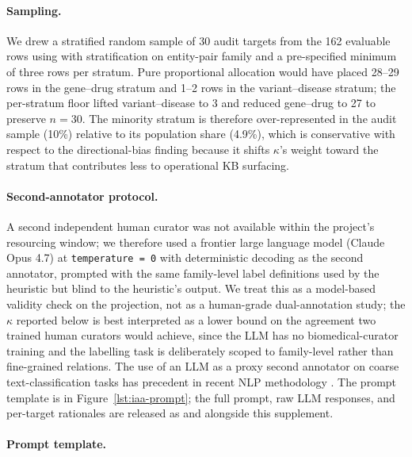 \paragraph{Sampling.}
We drew a stratified random sample of 30 audit targets from the 162
evaluable rows using  with stratification on
entity-pair family and a pre-specified minimum of three rows per
stratum. Pure proportional allocation would have placed 28--29 rows
in the gene--drug stratum and 1--2 rows in the variant--disease
stratum; the per-stratum floor lifted variant--disease to 3 and
reduced gene--drug to 27 to preserve \(n=30\). The minority stratum
is therefore over-represented in the audit sample (10\%) relative
to its population share (4.9\%), which is conservative with respect
to the directional-bias finding because it shifts \(\kappa\)'s
weight toward the stratum that contributes less to operational KB
surfacing.

\paragraph{Second-annotator protocol.}
A second independent human curator was not available within the
project's resourcing window; we therefore used a frontier large
language model (Claude Opus 4.7) at \texttt{temperature = 0} with
deterministic decoding as the second annotator, prompted with the
same family-level label definitions used by the heuristic but
blind to the heuristic's output. We treat this as a model-based
validity check on the projection, not as a human-grade
dual-annotation study; the $\kappa$ reported below is best
interpreted as a lower bound on the agreement two trained human
curators would achieve, since the LLM has no biomedical-curator
training and the labelling task is deliberately scoped to
family-level rather than fine-grained relations. The use of an LLM
as a proxy second annotator on coarse text-classification tasks has
precedent in recent NLP methodology
\citep{gilardi2023llmannotator}. The prompt template is in
Figure~\ref{lst:iaa-prompt}; the full prompt, raw LLM responses,
and per-target rationales are released as 
and  alongside this supplement.

\paragraph{Prompt template.}

